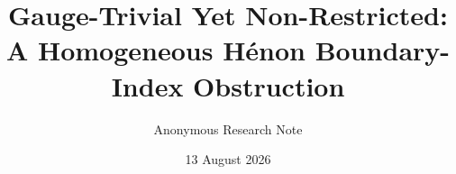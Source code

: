 \documentclass[11pt]{article}
\title{Gauge-Trivial Yet Non-Restricted:\\
A Homogeneous H\'enon Boundary-Index Obstruction}
\author{Anonymous Research Note}
\date{13 August 2026}
\theoremstyle{definition}
\theoremstyle{remark}
\begin{document}
\maketitle
\begin{abstract}

\end{abstract}









\appendix


\end{document}
